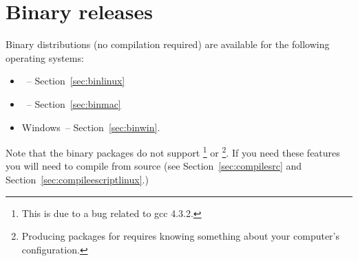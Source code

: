 %
%
%


\chapter{Binary releases}\label{chap:bin}

Binary distributions (no compilation required) are available for the following operating systems:
\begin{itemize}
 \item \linux~-- Section~\ref{sec:binlinux}
 \item \macosx~-- Section~\ref{sec:binmac}
 \item Windows~-- Section~\ref{sec:binwin}.
\end{itemize}

Note that the binary packages do not support \openmp\footnote{This is due to a bug related to gcc 4.3.2.} or \mpi\footnote{Producing packages for \mpi requires knowing something about your computer's configuration.}.
If you need these features you will need to compile \esfinley from source (see Section~\ref{sec:compilesrc} and Section~\ref{sec:compileescriptlinux}.)



